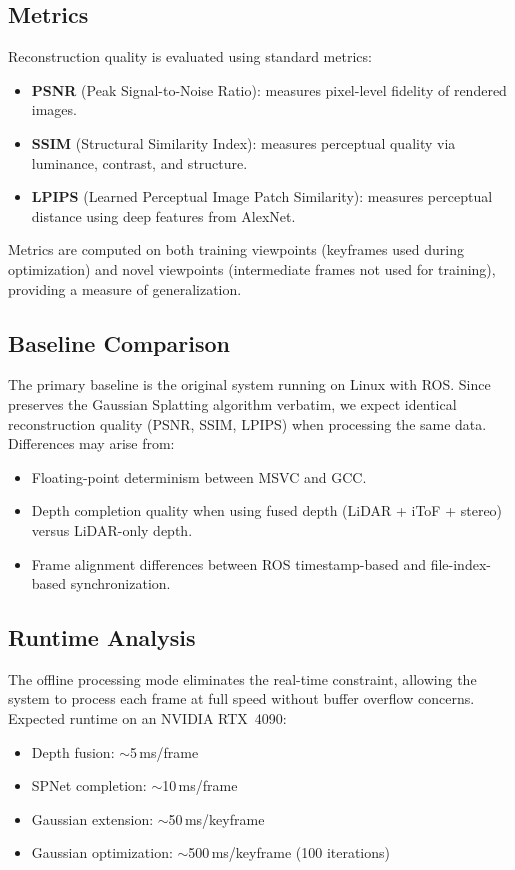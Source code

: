 \subsection{Metrics}

Reconstruction quality is evaluated using standard metrics:

\begin{itemize}
    \item \textbf{PSNR} (Peak Signal-to-Noise Ratio): measures pixel-level
    fidelity of rendered images.
    \item \textbf{SSIM} (Structural Similarity Index): measures perceptual
    quality via luminance, contrast, and structure.
    \item \textbf{LPIPS} (Learned Perceptual Image Patch Similarity):
    measures perceptual distance using deep features from AlexNet.
\end{itemize}

Metrics are computed on both training viewpoints (keyframes used during
optimization) and novel viewpoints (intermediate frames not used for
training), providing a measure of generalization.

\subsection{Baseline Comparison}

The primary baseline is the original \gaussianlic{} system running on
Linux with ROS. Since \winlic{} preserves the Gaussian Splatting algorithm
verbatim, we expect identical reconstruction quality (PSNR, SSIM, LPIPS)
when processing the same data. Differences may arise from:

\begin{itemize}
    \item Floating-point determinism between MSVC and GCC.
    \item Depth completion quality when using fused depth (LiDAR + iToF + stereo)
    versus LiDAR-only depth.
    \item Frame alignment differences between ROS timestamp-based and
    file-index-based synchronization.
\end{itemize}

\subsection{Runtime Analysis}

The offline processing mode eliminates the real-time constraint, allowing
the system to process each frame at full speed without buffer overflow
concerns. Expected runtime on an NVIDIA RTX~4090:
\begin{itemize}
    \item Depth fusion: $\sim$5\,ms/frame
    \item SPNet completion: $\sim$10\,ms/frame
    \item Gaussian extension: $\sim$50\,ms/keyframe
    \item Gaussian optimization: $\sim$500\,ms/keyframe (100 iterations)
\end{itemize}

